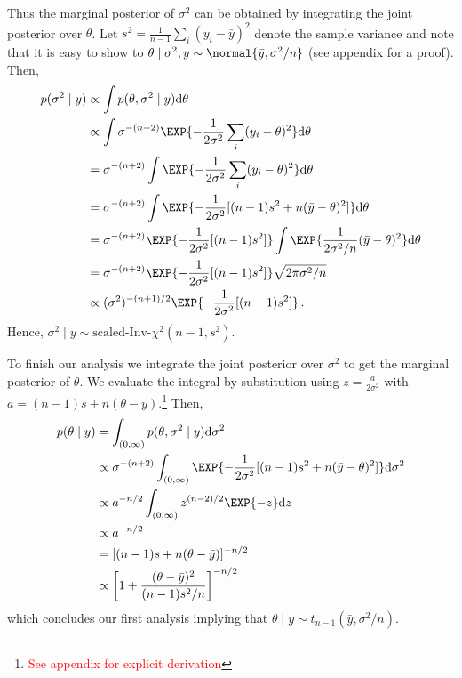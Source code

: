 Thus the marginal posterior of $\sigma^2$ can be obtained by integrating the joint posterior
over $\theta$. Let $s^2 = \frac{1}{n-1} \sum_i (y_i - \bar{y})^2$ denote the sample
variance and note that it is easy to show to
$\theta \mid \sigma^2, y \sim \normal{\bar{y}, \sigma^2/n}$ (see appendix for a proof).
Then,
\begin{align}
  p(\sigma^2 \mid y) &\propto \int p(\theta, \sigma^2 \mid y) \mathrm{d} \theta\\
  &\propto \int \sigma^{-(n+2)} \EXP{-\frac{1}{2\sigma^2}\sum_i (y_i - \theta)^2} \mathrm{d} \theta\\
  &= \sigma^{-(n+2)} \int \EXP{-\frac{1}{2\sigma^2}\sum_i (y_i - \theta)^2} \mathrm{d} \theta\\
  &= \sigma^{-(n+2)} \int \EXP{-\frac{1}{2\sigma^2}[(n-1) s^2 + n(\bar{y} - \theta)^2]} \mathrm{d} \theta\\
  &= \sigma^{-(n+2)} \EXP{-\frac{1}{2\sigma^2}[(n-1) s^2]} \int \EXP{\frac{1}{2\sigma^2/n}(\bar{y} - \theta)^2} \mathrm{d} \theta\\
  &= \sigma^{-(n+2)} \EXP{-\frac{1}{2\sigma^2}[(n-1) s^2]} \sqrt{2 \pi \sigma^2 / n} \\
  &\propto (\sigma^2)^{-(n+1)/2} \EXP{-\frac{1}{2\sigma^2}[(n-1) s^2]} \,.
\end{align}
Hence, $\sigma^2 \mid y \sim \text{scaled-Inv-} \chi^2(n-1, s^2)$.

To finish our analysis we integrate the joint posterior over $\sigma^2$ to get
the marginal posterior of $\theta$. We evaluate the integral by substitution using
$z = \frac{a}{2 \sigma^2}$ with $a = (n-1)s + n(\theta - \bar{y})$.\footnote{\textcolor{red}{See appendix for explicit derivation}}
Then,
\begin{align}
  p(\theta \mid y) &= \int_{(0, \infty)} p(\theta, \sigma^2 \mid y) \mathrm{d}\sigma^2\\
  &\propto \sigma^{-(n+2)} \int_{(0, \infty)} \EXP{-\frac{1}{2\sigma^2}[(n-1) s^2 + n(\bar{y} - \theta)^2]} \mathrm{d} \sigma^2\\
  &\propto a^{-n/2} \int_{(0, \infty)} z^{(n-2)/2}\EXP{-z} \mathrm{d}z\\
  &\propto a^{-n/2}\\
  &= [(n-1)s + n(\theta - \bar{y})]^{-n/2}\\
  &\propto \left[1 + \frac{(\theta - \bar{y})^2}{(n-1) s^2 / n}\right]^{-n/2} \,
\end{align}
which concludes our first analysis implying that $\theta \mid y \sim t_{n-1}(\bar{y}, \sigma^2/n)$.

